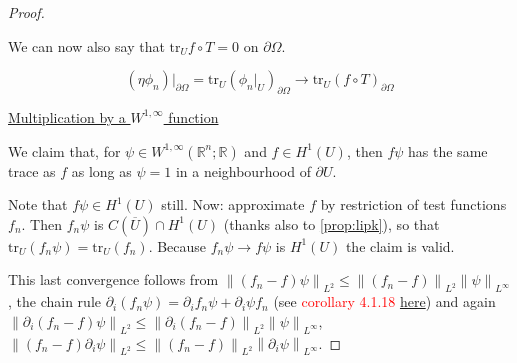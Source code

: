 \documentclass[english,a4paper,10pt,oneside]{scrbook}	%
\theoremstyle{break}
\newenvironment{mproof}[1][\proofname]{%
  \begin{proof}[#1]$ $\par\nobreak\ignorespaces
}{%
  \end{proof}
}
\renewcommand*{\proofname}{Proof}
\theoremstyle{remark}
\newcommand{\mR}{\mathbb{R}}
\newcommand{\norm}[1]{\left\lVert#1\right\rVert}
\newcommand{\tr}{\text{tr}}
\newcommand{\ind}[1]{\{\text{ #1 }\}}
\begin{document}
\begin{mproof}
We can now also say that $\tr_U f\circ T=0 $ on $\partial \Omega$.

%

$$(\eta \phi_n)|_{\partial \Omega} = \tr_U( \phi_n|_U)_{\partial \Omega} \rightarrow \tr_U(f \circ T)_{\partial \Omega}$$
%
%
%
%

\underline{Multiplication by a $W^{1,\infty}$ function}

We claim that, for $\psi \in W^{1,\infty}(\mR^n;\mR)$ and $f \in H^1(U)$, then $f\psi$ has the same trace as $f$ as long as $\psi = 1$ in a neighbourhood of $\partial U$.

Note that $f\psi \in H^1(U)$ still. Now: approximate $f$ by restriction of test functions $f_n$. Then $f_n \psi$ is $C(\overline{U})\cap H^1(U)$ (thanks also to \cref{prop:lipk}), so that $\tr_U(f_n\psi) = \tr_U(f_n)$. Because $f_n \psi \rightarrow f \psi$ is $H^1(U)$ the claim is valid.

This last convergence follows from $\norm{(f_n-f)\psi}_{L^2}\leq \norm{(f_n-f)}_{L^2}\norm{\psi}_{L^\infty}$, the chain rule $\partial_i(f_n\psi)=\partial_i f_n \psi + \partial_i \psi f_n$ (see \textcolor{red}{corollary 4.1.18 \href{https://www.math.stonybrook.edu/~joa/PUBLICATIONS/SOBOLEV.pdf}{here}}) and again $\norm{\partial_i(f_n-f)\psi}_{L^2}\leq \norm{\partial_i(f_n-f)}_{L^2}\norm{\psi}_{L^\infty}$, $\norm{(f_n-f)\partial_i\psi}_{L^2}\leq \norm{(f_n-f)}_{L^2}\norm{\partial_i\psi}_{L^\infty}$.


\end{mproof}
\end{document}
